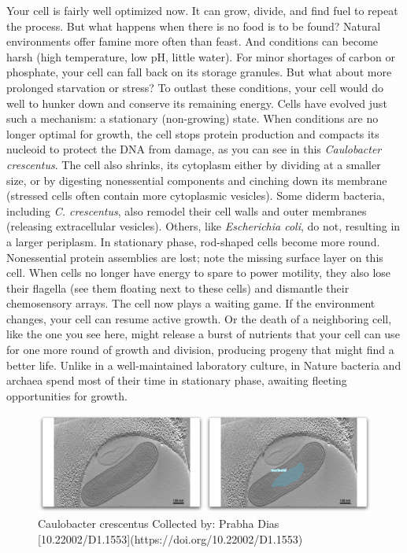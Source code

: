 \documentclass[]{tufte-book}
\begin{document}
Your cell is fairly well optimized now. It can grow, divide, and find
fuel to repeat the process. But what happens when there is no food is to
be found? Natural environments offer famine more often than feast. And
conditions can become harsh (high temperature, low pH, little water).
For minor shortages of carbon or phosphate, your cell can fall back on
its storage granules. But what about more prolonged starvation or
stress? To outlast these conditions, your cell would do well to hunker
down and conserve its remaining energy. Cells have evolved just such a
mechanism: a stationary (non-growing) state. When conditions are no
longer optimal for growth, the cell stops protein production and
compacts its nucleoid to protect the DNA from damage, as you can see in
this \emph{Caulobacter crescentus}. The cell also shrinks, its cytoplasm
either by dividing at a smaller size, or by digesting nonessential
components and cinching down its membrane (stressed cells often contain
more cytoplasmic vesicles). Some diderm bacteria, including \emph{C.
crescentus}, also remodel their cell walls and outer membranes
(releasing extracellular vesicles). Others, like \emph{Escherichia
coli}, do not, resulting in a larger periplasm. In stationary phase,
rod-shaped cells become more round. Nonessential protein assemblies are
lost; note the missing surface layer on this cell. When cells no longer
have energy to spare to power motility, they also lose their flagella
(see them floating next to these cells) and dismantle their chemosensory
arrays. The cell now plays a waiting game. If the environment changes,
your cell can resume active growth. Or the death of a neighboring cell,
like the one you see here, might release a burst of nutrients that your
cell can use for one more round of growth and division, producing
progeny that might find a better life. Unlike in a well-maintained
laboratory culture, in Nature bacteria and archaea spend most of their
time in stationary phase, awaiting fleeting opportunities for growth.

\begin{figure}
\includegraphics{movie_stills/8_1} \caption[Caulobacter crescentus Collected by]{Caulobacter crescentus Collected by: Prabha Dias [10.22002/D1.1553](https://doi.org/10.22002/D1.1553)}\label{fig:unnamed-chunk-133}
\end{figure}
\end{document}
